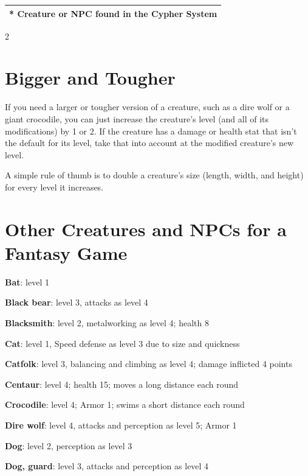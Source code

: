 \begin{longtable}{|c|c|}
\multicolumn{2}{|c|}{* Creature or NPC found in the Cypher System} \\ \hline 

\end{longtable} 

\begin{multicols}{2}

\section{Bigger and Tougher}

If you need a larger or tougher version of a creature, such as a dire wolf or a giant crocodile, you can just increase the creature’s level (and all of its modifications) by 1 or 2. If the creature has a damage or health stat that isn’t the default for its level, take that into account at the modified creature’s new level.

A simple rule of thumb is to double a creature’s size (length, width, and height) for every level it increases.

\section{Other Creatures and NPCs for a Fantasy Game}

\textbf{Bat}: level 1

\textbf{Black bear}: level 3, attacks as level 4

\textbf{Blacksmith}: level 2, metalworking as level 4; health 8

\textbf{Cat}: level 1, Speed defense as level 3 due to size and quickness

\textbf{Catfolk}: level 3, balancing and climbing as level 4; damage inflicted 4 points

\textbf{Centaur}: level 4; health 15; moves a long distance each round

\textbf{Crocodile}: level 4; Armor 1; swims a short distance each round

\textbf{Dire wolf}: level 4, attacks and perception as level 5; Armor 1

\textbf{Dog}: level 2, perception as level 3

\textbf{Dog, guard}: level 3, attacks and perception as level 4


\end{multicols}
